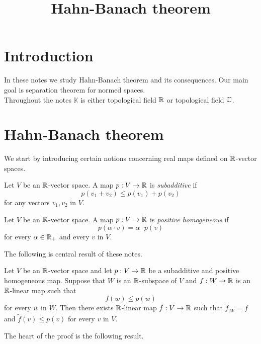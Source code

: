 



\title{Hahn-Banach theorem}
\date{}
\maketitle

\section{Introduction}
\noindent
In these notes we study Hahn-Banach theorem and its consequences. Our main goal is separation theorem for normed spaces.\\
Throughout the notes $\mathbb{K}$ is either topological field ${\mathbb R}$ or topological field ${\mathbb C}$.

\section{Hahn-Banach theorem}
\noindent
We start by introducing certain notions concerning real maps defined on ${\mathbb R}$-vector spaces.

\begin{definition}
Let $V$ be an ${\mathbb R}$-vector space. A map $p:V\rightarrow {\mathbb R}$ is \textit{subadditive} if 
$$p(v_1 + v_2)\leq p(v_1) + p(v_2)$$
for any vectors $v_1,v_2$ in $V$.
\end{definition}

\begin{definition}
Let $V$ be an ${\mathbb R}$-vector space. A map $p:V\rightarrow {\mathbb R}$ is \textit{positive homogeneous} if 
$$p(\alpha \cdot v) = \alpha \cdot p(v)$$
for every $\alpha \in {\mathbb R}_+$ and every $v$ in $V$.
\end{definition}
\noindent
The following is central result of these notes.

\begin{theorem}\label{theorem:hahn_banach_theorem}
Let $V$ be an ${\mathbb R}$-vector space and let $p:V\rightarrow {\mathbb R}$ be a subadditive and positive homogeneous map. Suppose that $W$ is an ${\mathbb R}$-subspace of $V$ and $f:W\rightarrow {\mathbb R}$ is an ${\mathbb R}$-linear map such that
$$f(w) \leq p(w)$$
for every $w$ in $W$. Then there exists ${\mathbb R}$-linear map $\tilde{f}:V\rightarrow {\mathbb R}$ such that $\tilde{f}_{\mid W} = f$ and $\tilde{f}(v) \leq p(v)$ for every $v$ in $V$.
\end{theorem}
\noindent
The heart of the proof is the following result.

